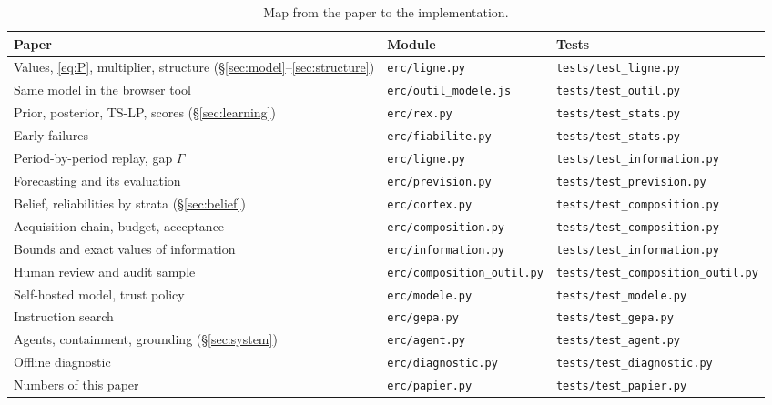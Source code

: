 \begin{table}[H]
\centering\footnotesize
\caption{Map from the paper to the implementation.}\label{tab:map}
\begin{tabular}{p{}p{}p{}}
\toprule
Paper & Module & Tests \\
\midrule
Values, \eqref{eq:P}, multiplier, structure (\S\ref{sec:model}--\ref{sec:structure}) & \texttt{erc/ligne.py} & \texttt{tests/test\_ligne.py} \\
Same model in the browser tool & \texttt{erc/outil\_modele.js} & \texttt{tests/test\_outil.py} \\
Prior, posterior, TS-LP, scores (\S\ref{sec:learning}) & \texttt{erc/rex.py} & \texttt{tests/test\_stats.py} \\
Early failures & \texttt{erc/fiabilite.py} & \texttt{tests/test\_stats.py} \\
Period-by-period replay, gap $\Gamma$ & \texttt{erc/ligne.py} & \texttt{tests/test\_information.py} \\
Forecasting and its evaluation & \texttt{erc/prevision.py} & \texttt{tests/test\_prevision.py} \\
Belief, reliabilities by strata (\S\ref{sec:belief}) & \texttt{erc/cortex.py} & \texttt{tests/test\_composition.py} \\
Acquisition chain, budget, acceptance & \texttt{erc/composition.py} & \texttt{tests/test\_composition.py} \\
Bounds and exact values of information & \texttt{erc/information.py} & \texttt{tests/test\_information.py} \\
Human review and audit sample & \texttt{erc/composition\_outil.py} & \texttt{tests/test\_composition\_outil.py} \\
Self-hosted model, trust policy & \texttt{erc/modele.py} & \texttt{tests/test\_modele.py} \\
Instruction search & \texttt{erc/gepa.py} & \texttt{tests/test\_gepa.py} \\
Agents, containment, grounding (\S\ref{sec:system}) & \texttt{erc/agent.py} & \texttt{tests/test\_agent.py} \\
Offline diagnostic & \texttt{erc/diagnostic.py} & \texttt{tests/test\_diagnostic.py} \\
Numbers of this paper & \texttt{erc/papier.py} & \texttt{tests/test\_papier.py} \\
\bottomrule
\end{tabular}
\end{table}
